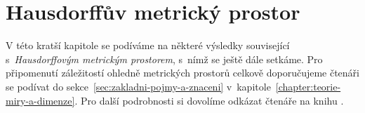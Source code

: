 \chapter{Hausdorffův metrický prostor}\label{chapter:hausdorffuv-mp}

V této kratší kapitole se podíváme na některé výsledky související s~\emph{Hausdorffovým metrickým prostorem}, s~nímž se ještě dále setkáme. Pro připomenutí záležitostí ohledně metrických prostorů celkově doporučujeme čtenáři se podívat do sekce~\ref{sec:zakladni-pojmy-a-znaceni} v~kapitole~\ref{chapter:teorie-miry-a-dimenze}. Pro další podrobnosti si dovolíme odkázat čtenáře na knihu \citep[str. 71]{Edgar2008}.


